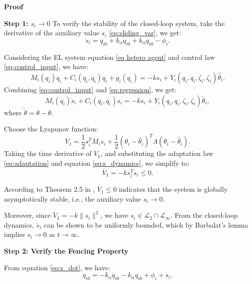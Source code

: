 \noindent\textbf{Proof}

\noindent\textbf{Step 1: $s_i\to 0$}
To verify the stability of the closed-loop system, take the derivative of the auxiliary value \( s_i \) \eqref {eq:sliding_var}, we get:
\begin{equation}\label{eq:s_dot}
	\dot{s}_i = \ddot{q}_{i0}+k_\alpha \dot{q}_{i0}+ k_\alpha  q_{i0}-\phi_i.
\end{equation}

Considering the EL system equation \eqref{eq hetero agent} and control law \eqref{eq:control_input}, we have:
\begin{equation*}\label{eq:EL_control}
	M_i(q_i)\ddot{q}_i+C_i(q_i,\dot{q}_i)\dot{q}_i+g_i(q_i)= -k s_i + Y_i(q_{i},\dot{q}_{i},\dot{\zeta}_i,\zeta_i) \hat{\theta}_i. 
\end{equation*}
Combining \eqref{eq:control_input} and \eqref{eq:regression}, we get:
\begin{equation}\label{eq:s_dynamics}
	M_i(q_i)\dot{s}_i+C_i(q_i,\dot{q}_i)s_i= -k s_i + Y_i(q_{i},\dot{q}_{i},\dot{\zeta}_i,\zeta_i) \tilde{\theta}_i, 
\end{equation}
where \(\tilde{\theta}=\hat{\theta}-\theta\).

Choose the Lyapunov function:
\begin{equation*}\label{eq:V1}
	V_1 = \frac{1}{2} s_i^T M_i s_i + \frac{1}{2} (\theta_i - \hat{\theta}_i)^T \Lambda (\theta_i - \hat{\theta}_i).
\end{equation*}
Taking the time derivative of \( V_1 \), and substituting the adaptation law \eqref{eq:adaptation} and equation \eqref{eq:s_dynamics}, we simplify to:
\begin{equation*}\label{eq:V1_dot}
	\dot{V_1} = -k s_i^T s_i \leq 0. 
\end{equation*}

According to Theorem 2.5 in \cite{chen2015stabilization}, \( \dot{V_1} \leq 0 \) indicates that the system is globally asymptotically stable, i.e., the auxiliary value \( s_i \to 0 \).

Moreover, since $\dot{V}_1 = -k\|s_i\|^2$, we have $s_i \in \mathcal{L}_2 \cap \mathcal{L}_\infty$. From the closed-loop dynamics, $\dot{s}_i$ can be shown to be uniformly bounded, which by Barbalat's lemma implies $s_i \to 0$ as $t\to\infty$.



\noindent\textbf{Step 2: Verify the Fencing Property}

From equation \eqref{eq:s_dot}, we have:
\begin{equation}\label{eq:q0_ddot}
	\ddot{q}_{i0}=-k_\alpha \dot{q}_{i0} -k_\alpha {q}_{i0} + \phi_i + \dot{s}_i.
\end{equation}

